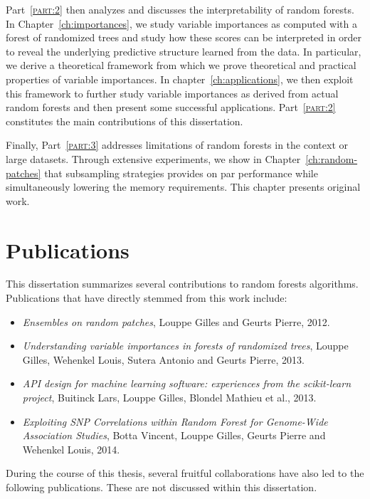 Part~\textsc{\ref{part:2}} then analyzes and discusses the interpretability of
random forests. In Chapter~\ref{ch:importances}, we study variable importances
as computed with a forest of randomized trees and study how these scores can be
interpreted in order to reveal the underlying predictive structure learned from
the data. In particular, we derive a theoretical framework from which we prove
theoretical and practical properties of variable importances. In
chapter~\ref{ch:applications}, we then exploit this framework to further study
variable importances as derived from actual random forests and then present
some successful applications. Part~\textsc{\ref{part:2}} constitutes
the main contributions of this dissertation.

Finally, Part~\textsc{\ref{part:3}} addresses limitations of random forests in
the context or large datasets. Through extensive experiments, we show in
Chapter~\ref{ch:random-patches} that subsampling strategies provides on par
performance while simultaneously lowering the memory requirements. This
chapter presents original work.

\section{Publications}

This dissertation summarizes several contributions to random forests
algorithms. Publications that have directly stemmed from this work include:

\begin{itemize}
\item \citep{louppe:2012} \textit{Ensembles on random patches}, Louppe Gilles and Geurts Pierre, 2012.

\item \citep{louppe:2013} \textit{Understanding variable importances in forests of randomized trees}, Louppe Gilles, Wehenkel Louis, Sutera Antonio and Geurts Pierre, 2013.

\item \citep{buitinck:2013} \textit{API design for machine learning software: experiences from the scikit-learn project}, Buitinck Lars, Louppe Gilles, Blondel Mathieu et al., 2013.
\item \citep{botta:2014} \textit{Exploiting SNP Correlations within Random Forest for Genome-Wide Association Studies}, Botta Vincent, Louppe Gilles, Geurts Pierre and Wehenkel Louis, 2014.
\end{itemize}

During the course of this thesis, several fruitful collaborations have also
led to the following publications. These are not discussed within
this dissertation.

